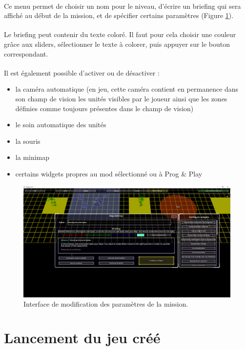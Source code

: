 \documentclass[a4paper]{article}
\begin{document}
\paragraph{ }
Ce menu permet de choisir un nom pour le niveau, d'écrire un briefing qui sera affiché au début de la mission, et de spécifier certains paramètres (Figure \ref{fig:editor-mapsettings}).
\paragraph{ }
Le briefing peut contenir du texte coloré. Il faut pour cela choisir une couleur grâce aux sliders, sélectionner le texte à colorer, puis appuyer sur le bouton correspondant.
\paragraph{ }
Il est également possible d'activer ou de désactiver :
\begin{itemize}
\item la caméra automatique (en jeu, cette caméra contient en permanence dans son champ de vision les unités visibles par le joueur ainsi que les zones définies comme toujours présentes dans le champ de vision)
\item le soin automatique des unités
\item la souris
\item la minimap
\item certains widgets propres au mod sélectionné ou à Prog \& Play
\end{itemize}
\begin{figure}[H]
\centering
\includegraphics[width=\linewidth]{editor-mapsettings.png}
\caption{Interface de modification des paramètres de la mission.}
\label{fig:editor-mapsettings}
\end{figure}
\section{Lancement du jeu créé}
\end{document}
